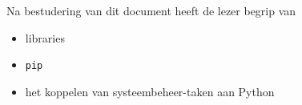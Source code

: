 Na bestudering van dit document heeft de lezer begrip van
\begin{itemize}
	\item libraries
	\item \texttt{pip}
	\item het koppelen van systeembeheer-taken aan Python
\end{itemize}


